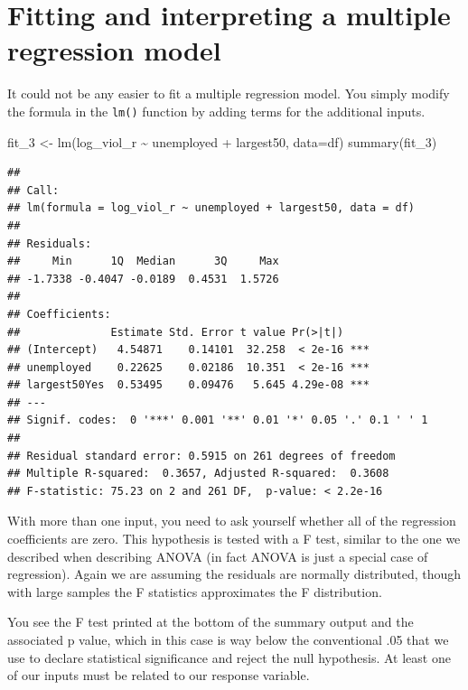 \documentclass[
]{book}
\newenvironment{Shaded}{\begin{snugshade}}{\end{snugshade}}
\newcommand{\AttributeTok}[1]{\textcolor[rgb]{0.77,0.63,0.00}{#1}}
\newcommand{\FunctionTok}[1]{\textcolor[rgb]{0.00,0.00,0.00}{#1}}
\newcommand{\NormalTok}[1]{#1}
\newcommand{\OtherTok}[1]{\textcolor[rgb]{0.56,0.35,0.01}{#1}}
\newcommand{\SpecialCharTok}[1]{\textcolor[rgb]{0.00,0.00,0.00}{#1}}
\begin{document}
\hypertarget{fitting-and-interpreting-a-multiple-regression-model}{%
\section{Fitting and interpreting a multiple regression model}\label{fitting-and-interpreting-a-multiple-regression-model}}

It could not be any easier to fit a multiple regression model. You simply modify the formula in the \texttt{lm()} function by adding terms for the additional inputs.

\begin{Shaded}
\begin{Highlighting}[]
\NormalTok{fit\_3 }\OtherTok{\textless{}{-}} \FunctionTok{lm}\NormalTok{(log\_viol\_r }\SpecialCharTok{\textasciitilde{}}\NormalTok{ unemployed }\SpecialCharTok{+}\NormalTok{ largest50, }\AttributeTok{data=}\NormalTok{df)}
\FunctionTok{summary}\NormalTok{(fit\_3)}
\end{Highlighting}
\end{Shaded}

\begin{verbatim}
## 
## Call:
## lm(formula = log_viol_r ~ unemployed + largest50, data = df)
## 
## Residuals:
##     Min      1Q  Median      3Q     Max 
## -1.7338 -0.4047 -0.0189  0.4531  1.5726 
## 
## Coefficients:
##              Estimate Std. Error t value Pr(>|t|)    
## (Intercept)   4.54871    0.14101  32.258  < 2e-16 ***
## unemployed    0.22625    0.02186  10.351  < 2e-16 ***
## largest50Yes  0.53495    0.09476   5.645 4.29e-08 ***
## ---
## Signif. codes:  0 '***' 0.001 '**' 0.01 '*' 0.05 '.' 0.1 ' ' 1
## 
## Residual standard error: 0.5915 on 261 degrees of freedom
## Multiple R-squared:  0.3657, Adjusted R-squared:  0.3608 
## F-statistic: 75.23 on 2 and 261 DF,  p-value: < 2.2e-16
\end{verbatim}

With more than one input, you need to ask yourself whether all of the regression coefficients are zero. This hypothesis is tested with a F test, similar to the one we described when describing ANOVA (in fact ANOVA is just a special case of regression). Again we are assuming the residuals are normally distributed, though with large samples the F statistics approximates the F distribution.

You see the F test printed at the bottom of the summary output and the associated p value, which in this case is way below the conventional .05 that we use to declare statistical significance and reject the null hypothesis. At least one of our inputs must be related to our response variable.
\end{document}
